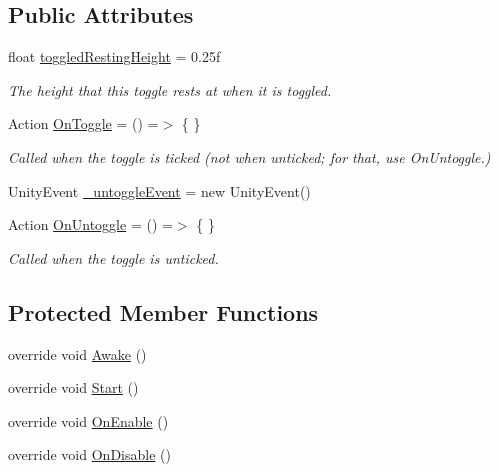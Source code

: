 \subsection*{Public Attributes}
\begin{DoxyCompactItemize}
\item 
float \mbox{\hyperlink{class_leap_1_1_unity_1_1_interaction_1_1_interaction_toggle_a52c3b4eb6b808f7c1234873725ea4699}{toggled\+Resting\+Height}} = 0.\+25f
\begin{DoxyCompactList}\small\item\em The height that this toggle rests at when it is toggled. \end{DoxyCompactList}\item 
Action \mbox{\hyperlink{class_leap_1_1_unity_1_1_interaction_1_1_interaction_toggle_a4d6b89ed3edf03304314adeb0be46130}{On\+Toggle}} = () =$>$ \{ \}
\begin{DoxyCompactList}\small\item\em Called when the toggle is ticked (not when unticked; for that, use On\+Untoggle.) \end{DoxyCompactList}\item 
Unity\+Event \mbox{\hyperlink{class_leap_1_1_unity_1_1_interaction_1_1_interaction_toggle_a28d81a96312e39af3871b395e977d088}{\+\_\+untoggle\+Event}} = new Unity\+Event()
\item 
Action \mbox{\hyperlink{class_leap_1_1_unity_1_1_interaction_1_1_interaction_toggle_a19deb4f0a9661a3e6fbfbc23d9d4512f}{On\+Untoggle}} = () =$>$ \{ \}
\begin{DoxyCompactList}\small\item\em Called when the toggle is unticked. \end{DoxyCompactList}\end{DoxyCompactItemize}
\subsection*{Protected Member Functions}
\begin{DoxyCompactItemize}
\item 
override void \mbox{\hyperlink{class_leap_1_1_unity_1_1_interaction_1_1_interaction_toggle_ad2840a310771196cfe8e13b6e21e0fdd}{Awake}} ()
\item 
override void \mbox{\hyperlink{class_leap_1_1_unity_1_1_interaction_1_1_interaction_toggle_ab72d4861fbce848ae802d990917ee50e}{Start}} ()
\item 
override void \mbox{\hyperlink{class_leap_1_1_unity_1_1_interaction_1_1_interaction_toggle_ac5a6bd9608c07270d3ef41feb0913bba}{On\+Enable}} ()
\item 
override void \mbox{\hyperlink{class_leap_1_1_unity_1_1_interaction_1_1_interaction_toggle_a9cbebe0123cbea22e469877317fa97ac}{On\+Disable}} ()
\end{DoxyCompactItemize}
